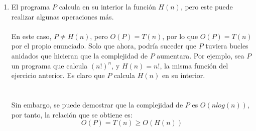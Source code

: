 \documentclass[11pt, a4paper]{exam}
\begin{document}
\begin{questions}
\begin{parts}
\begin{solution}
\begin{enumerate}
                \item El programa $P$ calcula en su interior la función $H(n)$, pero este puede realizar algunas operaciones más.
                \\
                \\
                En este caso, $P \neq H(n)$, pero $O(P) = T(n)$, por lo que $O(P) = T(n)$ por el propio enunciado. Solo que ahora, podría suceder que $P$ tuviera bucles anidados que hicieran que la complejidad de $P$ aumentara. Por ejemplo, sea $P$ un programa que calcula $(n!)^n$, y $H(n) = n!$, la misma función del ejercicio anterior. Es claro que $P$ calcula $H(n)$ en su interior. 
                \\
                \\
                \\
                Sin embargo, se puede demostrar que la complejidad de $P$ es $O(nlog(n))$, por tanto, la relación que se obtiene es:
                \begin{equation*}
                    O(P) = T(n) \geq O(H(n))  
                \end{equation*}
                \\
            \end{enumerate} 
            



        \end{solution}
    \end{parts}


\end{questions}
\end{document}
